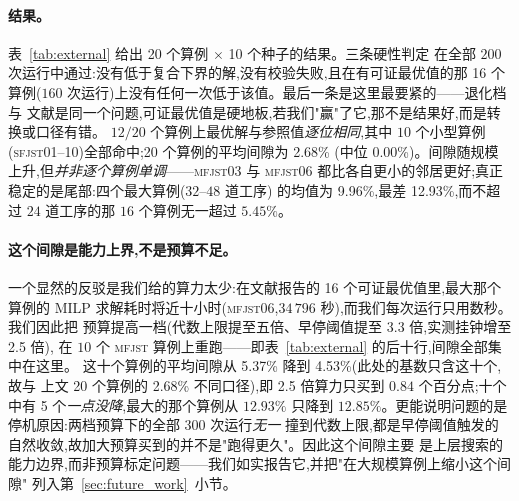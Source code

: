\documentclass[manuscript,screen,review]{acmart}
\newcommand{\NSeeds}{10}
\newcommand{\PubNInst}{20}
\newcommand{\PubNOpt}{16}                 %
\newcommand{\PubNMatch}{12}               %
\newcommand{\PubGapMean}{2.68\%}          %
\newcommand{\PubGapMed}{0.00\%}
\newcommand{\PubGapMax}{12.93\%}
\newcommand{\PubGapBig}{9.96\%}           %
\newcommand{\PubGapMeanSeed}{5.29\%}      %
\newcommand{\PubBudgetRatio}{2.5}
\newcommand{\PubGapLoBudget}{5.37\%}      %
\newcommand{\PubGapHiBudget}{4.53\%}      %
\newcommand{\PubBudgetGainPP}{0.84}       %
\newcommand{\PubBudgetNoGain}{5}          %
\newcommand{\PubLBSlack}{10.3\%}          %
\newcommand{\PubLBTotal}{10.8\%}          %
\begin{document}
\paragraph{结果。}
表~\ref{tab:external} 给出 \PubNInst{} 个算例 $\times$ \NSeeds{} 个种子的结果。三条硬性判定
在全部 $200$ 次运行中通过:没有低于复合下界的解,没有校验失败,且在有可证最优值的那
\PubNOpt{} 个算例($160$ 次运行)上没有任何一次低于该值。最后一条是这里最要紧的——退化档与
文献是同一个问题,可证最优值是硬地板,若我们"赢"了它,那不是结果好,而是转换或口径有错。
$\PubNMatch{}/\PubNInst{}$ 个算例上最优解与参照值\emph{逐位相同},其中 $10$ 个小型算例
(\textsc{sfjst}01--10)全部命中;\PubNInst{} 个算例的平均间隙为 \PubGapMean{}
(中位 \PubGapMed{})。间隙随规模上升,但\emph{并非逐个算例单调}——\textsc{mfjst}03 与
\textsc{mfjst}06 都比各自更小的邻居更好;真正稳定的是尾部:四个最大算例($32$--$48$ 道工序)
的均值为 \PubGapBig{},最差 \PubGapMax{},而不超过 $24$ 道工序的那 $16$ 个算例无一超过
$5.45\%$。

\begin{table}[t]
\caption{公开基准上的退化对标(排他约束删去,与文献同一问题)。"参照"列的
\textsc{opt} 为 MILP 证明的最优值、\textsc{bk} 为已发表最好值;间隙以 \NSeeds{} 个种子的最优
解计。星号标出最优解与参照值逐位相同者。数据:\texttt{experiments\_database/gap\_ideal.csv}。}
\label{tab:external}
\centering
\small

\end{table}

\paragraph{这个间隙是能力上界,不是预算不足。}
一个显然的反驳是我们给的算力太少:在文献报告的 \PubNOpt{} 个可证最优值里,最大那个算例的
MILP 求解耗时将近十小时(\textsc{mfjst}06,$34\,796$ 秒),而我们每次运行只用数秒。我们因此把
预算提高一档(代数上限提至五倍、早停阈值提至 $3.3$ 倍,实测挂钟增至 \PubBudgetRatio{} 倍),
在 $10$ 个 \textsc{mfjst} 算例上重跑——即表~\ref{tab:external} 的后十行,间隙全部集中在这里。
这十个算例的平均间隙从 \PubGapLoBudget{} 降到 \PubGapHiBudget{}(此处的基数只含这十个,故与
上文 \PubNInst{} 个算例的 \PubGapMean{} 不同口径),即 \PubBudgetRatio{} 倍算力只买到
$\PubBudgetGainPP$ 个百分点;十个中有 \PubBudgetNoGain{} 个\emph{一点没降},最大的那个算例从
$12.93\%$ 只降到 $12.85\%$。更能说明问题的是停机原因:两档预算下的全部 $300$ 次运行\emph{无一}
撞到代数上限,都是早停阈值触发的自然收敛,故加大预算买到的并不是"跑得更久"。因此这个间隙主要
是上层搜索的能力边界,而非预算标定问题——我们如实报告它,并把"在大规模算例上缩小这个间隙"
列入第~\ref{sec:future_work}~小节。
\end{document}
